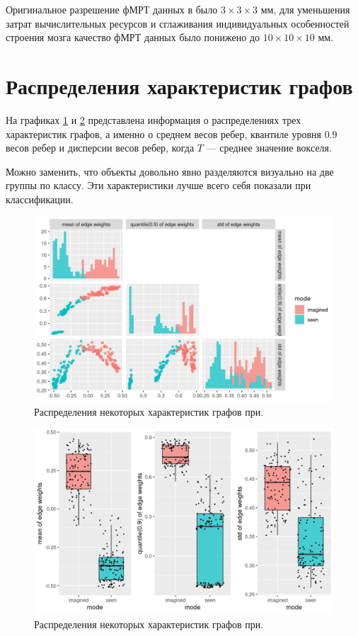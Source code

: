 \documentclass[specialist,
substylefile = spbu_report.rtx,
subf,href,colorlinks=true, 12pt]{disser}
\begin{document}
			Оригинальное разрешение фМРТ данных в было $3 \times 3 \times 3$ мм, для уменьшения затрат вычислительных ресурсов и сглаживания индивидуальных особенностей строения мозга качество фМРТ данных было понижено до $10 \times 10 \times 10$ мм.
	
		\section{Распределения характеристик графов}
			На графиках \ref{fg:3} и \ref{fg:4} представлена информация о распределениях трех характеристик графов, а именно о среднем весов ребер, квантиле уровня $0.9$ весов ребер и дисперсии весов ребер, когда $T$ --- среднее значение вокселя.
			
			Можно заменить, что объекты довольно явно разделяются визуально на две группы по классу. Эти характеристики лучше всего себя показали при классификации.
		
			\begin{figure}[h]
				\centering
				\includegraphics[width=15cm]{../images/graph_feachers_1.png}
				\caption{Распределения некоторых характеристик графов при.} 
				\label{fg:3}
			\end{figure}
		
			\begin{figure}[t!]
				\centering
				\includegraphics[width=15cm]{../images/graph_feachers_2.png}
				\caption{Распределения некоторых характеристик графов при.} 
				\label{fg:4}
			\end{figure}						 
		
\end{document}
